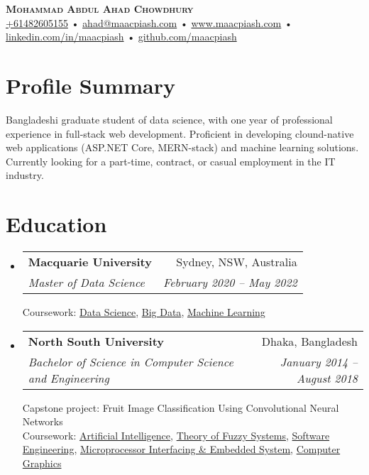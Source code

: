 \documentclass[letter-paper,10pt]{article}
\makeatletter
\newcommand{\resumeSubheading}[4]{
  \vspace{-1pt}\item
    \begin{tabular*}{0.97\textwidth}[t]{l@{\extracolsep{\fill}}r}
      \textbf{#1} & #2 \\
      \textit{#3} & \textit{ #4} \\
    \end{tabular*}\vspace{-5pt}
}
\newcommand{\resumeSubHeadingListStart}{\begin{itemize}[leftmargin=*]}
\newcommand{\resumeSubHeadingListEnd}{\end{itemize}}
\makeatother
\begin{document}
\begin{center}
    \textbf{\Huge \scshape Mohammad Abdul Ahad Chowdhury} \\ \vspace{1pt}
    \small \href{tel:+61482605155}{+61482605155} • \href{mailto:ahad@maacpiash.com}{ahad@maacpiash.com} •
    \small \href{https://www.maacpiash.com}{www.maacpiash.com} • 
    \small \href{https://linkedin.com/in/maacpiash}{linkedin.com/in/maacpiash} •
    \small \href{https://github.com/maacpiash}{github.com/maacpiash}
\end{center}

\section{Profile Summary}
Bangladeshi graduate student of data science, with one year of professional experience in full-stack web development. Proficient in developing clound-native web applications (ASP.NET Core, MERN-stack) and machine learning solutions. Currently looking for a part-time, contract, or casual employment in the IT industry.


\section{Education}
  \resumeSubHeadingListStart
    \resumeSubheading
      {Macquarie University}{Sydney, NSW, Australia}
      {Master of Data Science}{February 2020 -- May 2022}

      Coursework: \href{https://github.com/maacpiash/COMP6200}{Data Science}, \href{https://github.com/maacpiash/COMP6210}{Big Data}, \href{https://github.com/maacpiash/COMP8220}{Machine Learning}
      
    \resumeSubheading
      {North South University}{Dhaka, Bangladesh}
      {Bachelor of Science in Computer Science and Engineering}{January 2014 -- August 2018}
      
      Capstone project: Fruit Image Classification Using Convolutional Neural Networks \\
      Coursework: \href{https://github.com/maacpiash/CSE440}{Artificial Intelligence}, \href{https://github.com/maacpiash/CSE470}{Theory of Fuzzy Systems}, \href{https://github.com/maacpiash/CSE327}{Software Engineering}, \href{https://github.com/maacpiash/CSE331}{Microprocessor Interfacing \& Embedded System}, \href{https://github.com/maacpiash/SpaceShooter}{Computer Graphics}
  \resumeSubHeadingListEnd
\end{document}
